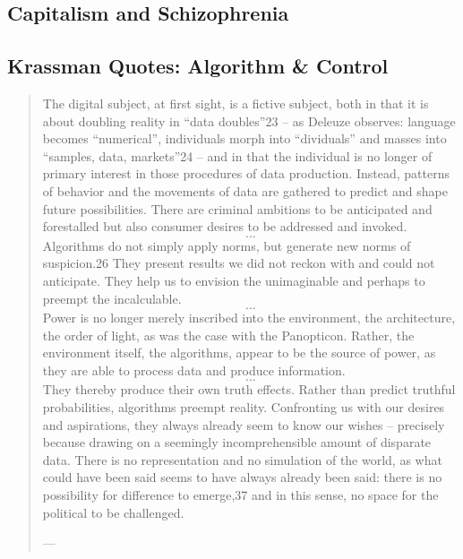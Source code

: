 


\subsection{Capitalism and Schizophrenia}



\subsection{Krassman Quotes: Algorithm \& Control}
\begin{quote}
	The digital subject, at first sight, is a fictive subject, both in that it is about doubling reality in “data doubles”23 – as Deleuze observes: language becomes “numerical”, individuals morph into “dividuals” and masses into “samples, data, markets”24 – and in that the individual is no longer of primary interest in those procedures of data production. Instead, patterns of behavior and the movements of data are gathered to predict and shape future possibilities. There are criminal ambitions to be anticipated and forestalled but also consumer desires to be addressed and invoked. \[...\] Algorithms do not simply apply norms, but generate new norms of suspicion.26 They present results we did not reckon with and could not anticipate. They help us to envision the unimaginable and perhaps to preempt the incalculable. \[...\] Power is no longer merely inscribed into the environment, the architecture, the order of light, as was the case with the Panopticon. Rather, the environment itself, the algorithms, appear to be the source of power, as they are able to process data and produce information. \[...\] They thereby produce their own truth effects. Rather than predict truthful probabilities, algorithms preempt reality. Confronting us with our desires and aspirations, they always already seem to know our wishes – precisely because drawing on a seemingly incomprehensible amount of disparate data. There is no representation and no simulation of the world, as what could have been said seems to have always already been said: there is no possibility for difference to emerge,37 and in this sense, no space for the political to be challenged.

	— \cite[15-16]{Krasmann2017}
\end{quote}



